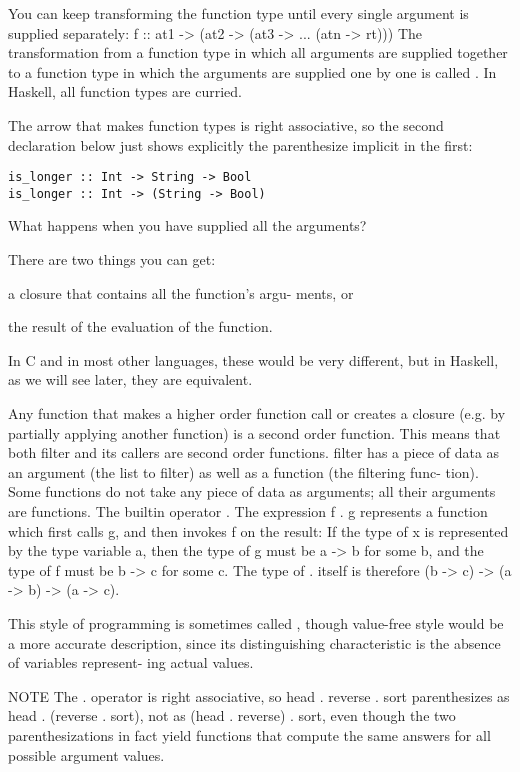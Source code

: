 You can keep transforming the function type until
every single argument is supplied separately:
f :: at1 -> (at2 -> (at3 -> ...
(atn -> rt)))
The transformation from a function type in which
all arguments are supplied together to a function
type in which the arguments are supplied one by
one is called .
In Haskell, all function types are curried. 

The
arrow that makes function types is right associative,
so the second declaration below just shows explicitly the parenthesize implicit in the first:
\begin{lstlisting}
is_longer :: Int -> String -> Bool
is_longer :: Int -> (String -> Bool)
\end{lstlisting}
What happens when you have supplied all the arguments?

There are two things you can get:
\begin{compactitem}
\item a closure that contains all the function’s argu-
ments, or
\item the result of the evaluation of the function.
\end{compactitem}
In C and in most other languages, these would be
very different, but in Haskell, as we will see later,
they are equivalent.

Any function that makes a higher order function
call or creates a closure (e.g. by partially applying
another function) is a second order function. This
means that both filter and its callers are second
order functions.
filter has a piece of data as an argument (the list
to filter) as well as a function (the filtering func-
tion). Some functions do not take any piece of data
as arguments; all their arguments are functions.
The builtin operator  .
The expression f . g represents a function which
first calls g, and then invokes f on the result:
If the type of x is represented by the type variable
a, then the type of g must be a -> b for some b,
and the type of f must be b -> c for some c. The
type of . itself is therefore (b -> c) -> (a -> b)
-> (a -> c).


This style of programming is sometimes called
, though value-free style would be a
more accurate description, since its distinguishing
characteristic is the absence of variables represent-
ing actual values.

NOTE The . operator is right associative, so
head . reverse . sort parenthesizes as head .
(reverse . sort), not as (head . reverse) .
sort, even though the two parenthesizations in fact
yield functions that compute the same answers for
all possible argument values.

